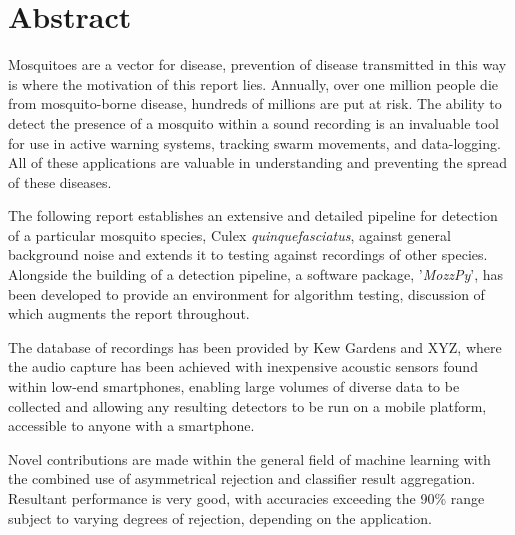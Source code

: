 \section*{Abstract}


Mosquitoes are a vector for disease, prevention of disease transmitted in this way is where the motivation of this report lies. Annually, over one million people die from mosquito-borne disease, hundreds of millions are put at risk. The ability to detect the presence of a mosquito within a sound recording is an invaluable tool for use in active warning systems, tracking swarm movements, and data-logging. All of these applications are valuable in understanding and preventing the spread of these diseases. 

The following report establishes an extensive and detailed pipeline for detection of a particular mosquito species, Culex \textit{quinquefasciatus}, against general background noise and extends it to testing against recordings of other species. Alongside the building of a detection pipeline, a software package, '\textit{MozzPy}', has been developed to provide an environment for algorithm testing, discussion of which augments the report throughout.

The database of recordings has been provided by Kew Gardens and XYZ, where the audio capture has been achieved with inexpensive acoustic sensors found within low-end smartphones, enabling large volumes of diverse data to be collected and allowing any resulting detectors to be run on a mobile platform, accessible to anyone with a smartphone.

Novel contributions are made within the general field of machine learning with the combined use of asymmetrical rejection and classifier result aggregation. Resultant performance is very good, with accuracies exceeding the 90\% range subject to varying degrees of rejection, depending on the application.